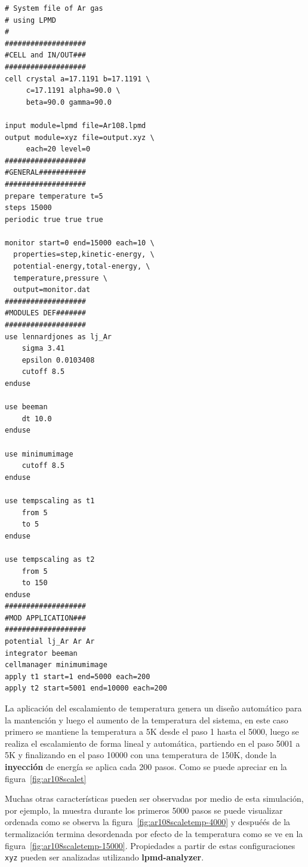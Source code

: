 \begin{multicols}{2}
\setlength{\columnseprule}{.5pt}
\begin{verbatim}
# System file of Ar gas 
# using LPMD
#
###################
#CELL and IN/OUT###
###################
cell crystal a=17.1191 b=17.1191 \
     c=17.1191 alpha=90.0 \
     beta=90.0 gamma=90.0

input module=lpmd file=Ar108.lpmd
output module=xyz file=output.xyz \
     each=20 level=0
###################
#GENERAL###########
###################
prepare temperature t=5
steps 15000
periodic true true true

monitor start=0 end=15000 each=10 \
  properties=step,kinetic-energy, \
  potential-energy,total-energy, \
  temperature,pressure \
  output=monitor.dat
###################
#MODULES DEF#######
###################
use lennardjones as lj_Ar
    sigma 3.41
    epsilon 0.0103408
    cutoff 8.5
enduse

use beeman
    dt 10.0
enduse

use minimumimage
    cutoff 8.5
enduse

use tempscaling as t1
    from 5
    to 5
enduse

use tempscaling as t2
    from 5
    to 150
enduse
###################
#MOD APPLICATION###
###################
potential lj_Ar Ar Ar
integrator beeman
cellmanager minimumimage
apply t1 start=1 end=5000 each=200
apply t2 start=5001 end=10000 each=200
\end{verbatim}
\end{multicols}

La aplicaci\'on del escalamiento de temperatura genera un dise\~no autom\'atico para la mantención y luego el aumento de la temperatura del sistema, en este caso primero se mantiene la temperatura a 5K desde el paso 1 hasta el 5000, luego se realiza el escalamiento de forma lineal y autom\'atica, partiendo en el paso 5001 a 5K y finalizando en el paso 10000 con una temperatura de 150K, donde la \textbf{inyecci\'on} de energ\'ia se aplica cada 200 pasos. Como se puede apreciar en la figura~\ref{fig:ar108scalet}


Muchas otras caracter\'isticas pueden ser observadas por medio de esta simulaci\'on, por ejemplo, la muestra durante los primeros 5000 pasos se puede visualizar ordenada como se observa la figura~\ref{fig:ar108scaletemp-4000} y despué\'es de la termalizaci\'on termina desordenada por efecto de la temperatura como se ve en la figura~\ref{fig:ar108scaletemp-15000}. Propiedades a partir de estas configuraciones \verb|xyz| pueden ser analizadas utilizando \textbf{lpmd-analyzer}.

